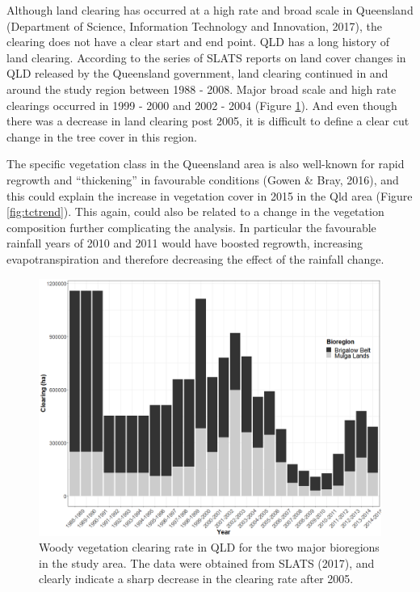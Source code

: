 \documentclass[fleqn,10pt,lineno]{wlpeerj} %
\theoremstyle{definition}
\theoremstyle{definition}
\theoremstyle{definition}
\theoremstyle{remark}
\begin{document}
Although land clearing has occurred at a high rate and broad scale in
Queensland (Department of Science, Information Technology and
Innovation, 2017), the clearing does not have a clear start and end
point. QLD has a long history of land clearing. According to the series
of SLATS reports on land cover changes in QLD released by the Queensland
government, land clearing continued in and around the study region
between 1988 - 2008. Major broad scale and high rate clearings occurred
in 1999 - 2000 and 2002 - 2004 (Figure \ref{fig:slat}). And even though
there was a decrease in land clearing post 2005, it is difficult to
define a clear cut change in the tree cover in this region.

The specific vegetation class in the Queensland area is also well-known
for rapid regrowth and ``thickening'' in favourable conditions (Gowen \&
Bray, 2016), and this could explain the increase in vegetation cover in
2015 in the Qld area (Figure \ref{fig:tctrend}). This again, could also
be related to a change in the vegetation composition further
complicating the analysis. In particular the favourable rainfall years
of 2010 and 2011 would have boosted regrowth, increasing
evapotranspiration and therefore decreasing the effect of the rainfall
change.

\begin{figure}
\includegraphics[width=0.9\linewidth]{figures/Fig11} \caption{Woody vegetation clearing rate in QLD for the two major bioregions in the study area. The data were obtained from SLATS (2017), and clearly indicate a sharp decrease in the clearing rate after 2005.}\label{fig:slat}
\end{figure}
\end{document}
